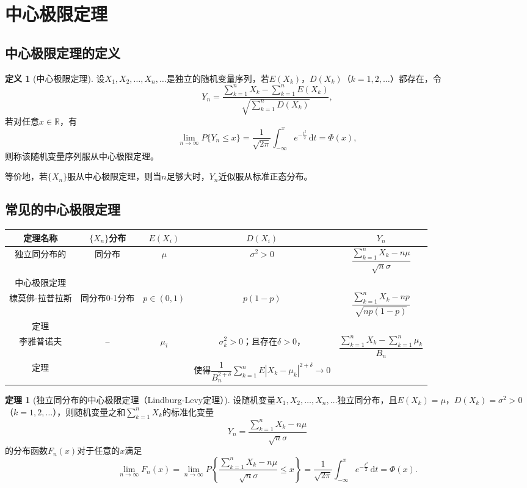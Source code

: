 \documentclass[11pt,a4paper]{report}
\theoremstyle{definition}
\newtheorem{definition}{定义}[chapter]
\newtheorem{theorem}{定理}[chapter]
\theoremstyle{plain}
\begin{document}
\section{中心极限定理}

\subsection{中心极限定理的定义}

\begin{definition}[中心极限定理]
设$X_1,X_2,\ldots,X_n,\ldots$是独立的随机变量序列，若$E(X_k)$，$D(X_k)$（$k=1,2,\ldots$）都存在，令
\[
Y_n=\frac{\sum_{k=1}^{n}X_k-\sum_{k=1}^{n}E(X_k)}{\sqrt{\sum_{k=1}^{n}D(X_k)}},
\]
若对任意$x\in\mathbb{R}$，有
\[
\lim_{n\to\infty}P\{Y_n\leq x\}=\frac{1}{\sqrt{2\pi}}\int_{-\infty}^{x}e^{-\frac{t^2}{2}}\,\mathrm{d}t=\Phi(x),
\]
则称该随机变量序列服从中心极限定理。
\end{definition}

等价地，若$\{X_n\}$服从中心极限定理，则当$n$足够大时，$Y_n$近似服从标准正态分布。

\subsection{常见的中心极限定理}

\begin{center}
\begin{tabular}{c|c|c|c|c}
\hline
定理名称 & $\{X_n\}$分布 & $E(X_i)$ & $D(X_i)$ & $Y_n$ \\
\hline
独立同分布的 & 同分布 & $\mu$ & $\sigma^2>0$ & $\dfrac{\sum_{k=1}^{n}X_k-n\mu}{\sqrt{n}\sigma}$ \\
中心极限定理 & & & & \\
\hline
棣莫佛-拉普拉斯 & 同分布0-1分布 & $p\in(0,1)$ & $p(1-p)$ & $\dfrac{\sum_{k=1}^{n}X_k-np}{\sqrt{np(1-p)}}$ \\
定理 & & & & \\
\hline
李雅普诺夫 & -- & $\mu_i$ & $\sigma_k^2>0$；且存在$\delta>0$， & $\dfrac{\sum_{k=1}^{n}X_k-\sum_{k=1}^{n}\mu_k}{B_n}$ \\
定理 & & & 使得$\dfrac{1}{B_n^{2+\delta}}\sum_{k=1}^{n}E|X_k-\mu_k|^{2+\delta}\to0$ & \\
\hline
\end{tabular}
\end{center}

\begin{theorem}[独立同分布的中心极限定理（Lindburg-Levy定理）]
设随机变量$X_1,X_2,\ldots,X_n,\ldots$独立同分布，且$E(X_k)=\mu$，$D(X_k)=\sigma^2>0$（$k=1,2,\ldots$），则随机变量之和$\sum_{k=1}^{n}X_k$的标准化变量
\[
Y_n=\frac{\sum_{k=1}^{n}X_k-n\mu}{\sqrt{n}\sigma}
\]
的分布函数$F_n(x)$对于任意的$x$满足
\[
\lim_{n\to\infty}F_n(x)=\lim_{n\to\infty}P\left\{\frac{\sum_{k=1}^{n}X_k-n\mu}{\sqrt{n}\sigma}\leq x\right\}=\frac{1}{\sqrt{2\pi}}\int_{-\infty}^{x}e^{-\frac{t^2}{2}}\,\mathrm{d}t=\Phi(x).
\]
\end{theorem}
\end{document}
